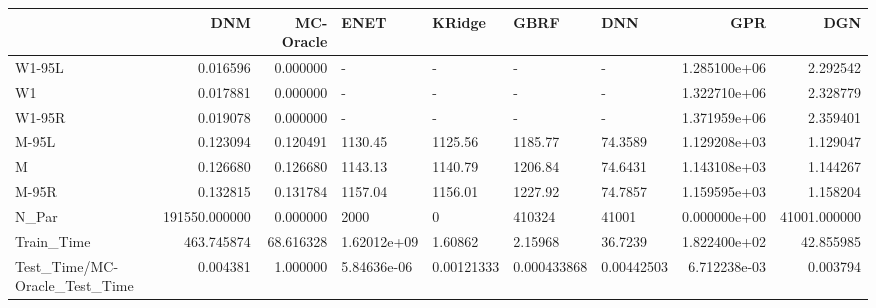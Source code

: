 \begin{tabular}{lrrllllrr}
\toprule
{} &            DNM &  MC-Oracle &         ENET &      KRidge &         GBRF &         DNN &           GPR &           DGN \\
\midrule
W1-95L                        &       0.016596 &   0.000000 &            - &           - &            - &           - &  1.285100e+06 &      2.292542 \\
W1                            &       0.017881 &   0.000000 &            - &           - &            - &           - &  1.322710e+06 &      2.328779 \\
W1-95R                        &       0.019078 &   0.000000 &            - &           - &            - &           - &  1.371959e+06 &      2.359401 \\
M-95L                         &       0.123094 &   0.120491 &      1130.45 &     1125.56 &      1185.77 &     74.3589 &  1.129208e+03 &      1.129047 \\
M                             &       0.126680 &   0.126680 &      1143.13 &     1140.79 &      1206.84 &     74.6431 &  1.143108e+03 &      1.144267 \\
M-95R                         &       0.132815 &   0.131784 &      1157.04 &     1156.01 &      1227.92 &     74.7857 &  1.159595e+03 &      1.158204 \\
N\_Par                         &  191550.000000 &   0.000000 &         2000 &           0 &       410324 &       41001 &  0.000000e+00 &  41001.000000 \\
Train\_Time                    &     463.745874 &  68.616328 &  1.62012e+09 &     1.60862 &      2.15968 &     36.7239 &  1.822400e+02 &     42.855985 \\
Test\_Time/MC-Oracle\_Test\_Time &       0.004381 &   1.000000 &  5.84636e-06 &  0.00121333 &  0.000433868 &  0.00442503 &  6.712238e-03 &      0.003794 \\
\bottomrule
\end{tabular}
